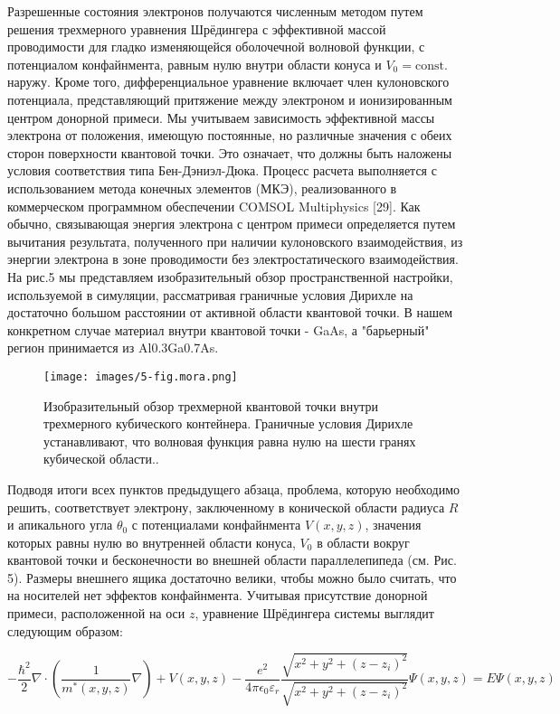 \documentclass[a4paper,14pt]{extarticle}
\begin{document}
Разрешенные состояния электронов получаются численным методом путем решения трехмерного уравнения Шрёдингера с эффективной массой проводимости для гладко изменяющейся оболочечной волновой функции, с потенциалом конфайнмента, равным нулю внутри области конуса и $V_0=\text{const.}$ наружу. Кроме того, дифференциальное уравнение включает член кулоновского потенциала, представляющий притяжение между электроном и ионизированным центром донорной примеси. Мы учитываем зависимость эффективной массы электрона от положения, имеющую постоянные, но различные значения с обеих сторон поверхности квантовой точки. Это означает, что должны быть наложены условия соответствия типа Бен-Дэниэл-Дюка. Процесс расчета выполняется с использованием метода конечных элементов (МКЭ), реализованного в коммерческом программном обеспечении COMSOL Multiphysics [29]. Как обычно, связывающая энергия электрона с центром примеси определяется путем вычитания результата, полученного при наличии кулоновского взаимодействия, из энергии электрона в зоне проводимости без электростатического взаимодействия. На рис.5 мы представляем изобразительный обзор пространственной настройки, используемой в симуляции, рассматривая граничные условия Дирихле на достаточно большом расстоянии от активной области квантовой точки. В нашем конкретном случае материал внутри квантовой точки - GaAs, а "барьерный" регион принимается из Al0.3Ga0.7As.\cite{mora}

\begin{figure}[htbp]
    \centering
    \texttt{[image: images/5-fig.mora.png]}
    \caption{\label{fig:mora3} Изобразительный обзор трехмерной квантовой точки внутри трехмерного кубического контейнера. Граничные условия Дирихле устанавливают, что волновая функция равна нулю на шести гранях кубической области.\cite{mora}.}
\end{figure}

Подводя итоги всех пунктов предыдущего абзаца, проблема, которую необходимо решить, соответствует электрону, заключенному в конической области радиуса $R$ и апикального угла $\theta_0$ с потенциалами конфайнмента $V(x, y, z)$, значения которых равны нулю во внутренней области конуса, $V_0$ в области вокруг квантовой точки и бесконечности во внешней области параллелепипеда (см. Рис. 5). Размеры внешнего ящика достаточно велики, чтобы можно было считать, что на носителей нет эффектов конфайнмента. Учитывая присутствие донорной примеси, расположенной на оси $z$, уравнение Шрёдингера системы выглядит следующим образом:

\begin{equation}
    -\frac{\hbar^2}{2} \nabla \cdot \left( \frac{1}{m^*(x, y, z)} \nabla \right) + V(x, y, z) - \frac{e^2}{4\pi\epsilon_0 \varepsilon_r} \frac{\sqrt{x^2 + y^2 + (z - z_i)^2}}{\sqrt{x^2 + y^2 + (z - z_i)^2}} \Psi(x, y, z) = E \Psi(x, y, z)
    \end{equation}
    
\end{document}
